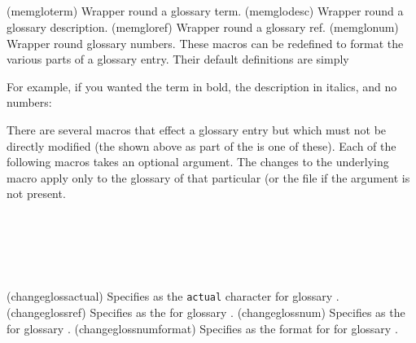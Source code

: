 \begin{syntax}
\cmd{\memgloterm} \\
\cmd{\memglodesc} \\
\cmd{\memgloref} \\
\cmd{\memglonum} \\
\end{syntax}
\glossary(memgloterm)%
  {}%
  {Wrapper round a glossary term.}%
\glossary(memglodesc)%
  {}%
  {Wrapper round a glossary description.}%
\glossary(memgloref)%
  {}%
  {Wrapper round a glossary ref.}%
\glossary(memglonum)%
  {}%
  {Wrapper round glossary numbers.}%
These macros can be redefined to format the various parts of a glossary entry.
Their default definitions are simply
\begin{lcode}
\newcommand{\memgloterm}[1]{#1}
\newcommand{\memglodesc}[1]{#1}
\newcommand{\memgloref}[1]{#1}
\newcommand{\memglonum}[1]{#1}
\end{lcode}
For example, if you wanted the term in bold, the description in italics,
 and no numbers:
\begin{lcode}
\renewcommand{\memgloterm}[1]{\textbf{#1}}
\renewcommand{\memglodesc}[1]{\textit{#1}}
\renewcommand{\memglonum}[1]{}
\end{lcode}

   There are several macros that effect a glossary entry 
but which must not be directly modified (the  shown above
as part of the \cmd{\glossaryentry} is one of these).
Each of the following  macros takes an optional 
argument. The changes to the underlying macro apply only to the 
glossary of that particular  (or the  file
if the argument is not present.
\begin{syntax}
\cmd{\changeglossactual} \\
\cmd{\changeglossref} \\
\cmd{\changeglossnum} \\
\cmd{\changeglossnumformat} \\
\end{syntax}
\glossary(changeglossactual)%
  {}%
  {Specifies  as the \texttt{actual} character for 
   glossary .}%
\glossary(changeglossref)%
  {}%
  {Specifies  as the  for 
   glossary .}%
\glossary(changeglossnum)%
  {}%
  {Specifies  as the  for 
   glossary .}%
\glossary(changeglossnumformat)%
  {}%
  {Specifies  as the format for  for 
   glossary .}%

